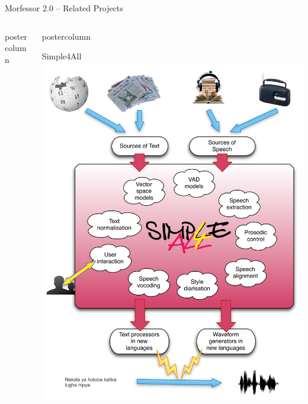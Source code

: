 \documentclass[final]{beamer} %
\begin{document}
\begin{frame}{Morfessor 2.0 -- Related Projects}
\begin{columns}
\begin{column}{.49\textwidth}
\begin{beamercolorbox}[center,wd=\textwidth]{postercolumn}
	\end{beamercolorbox}
\end{column}
\begin{column}{.5\textwidth}
  \begin{beamercolorbox}[center,wd=\textwidth]{postercolumn}
 \begin{block}{Simple4All}
\includegraphics[width=\textwidth]{s4a}             
            \end{block}
            
	\end{beamercolorbox}
\end{column}

\end{columns}
 \end{frame}



  
\end{document}
